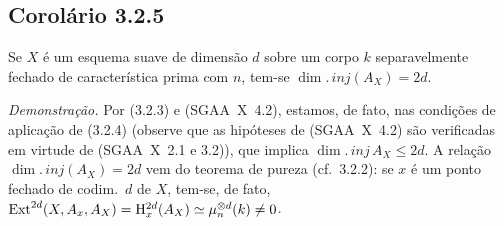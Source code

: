 \subsection*{Corolário 3.2.5}
Se $X$ é um esquema suave de dimensão $d$ sobre um corpo $k$ separavelmente fechado de característica prima com $n$, tem-se $\dim.\,inj(A_X) = 2d$.

\emph{Demonstração.} Por (3.2.3) e (SGAA~X~4.2), estamos, de fato, nas condições de aplicação de (3.2.4) (observe que as hipóteses de (SGAA~X~4.2) são verificadas em virtude de (SGAA~X~2.1 e 3.2)), que implica $\dim.\,inj\, A_X \leqslant 2d$. A relação $\dim.\,inj(A_X) = 2d$ vem do teorema de pureza (cf.~3.2.2): se $x$ é um ponto fechado de codim.~$d$ de $X$, tem-se, de fato, $\operatorname{Ext}^{2d}(X, A_x, A_X) = \mathrm{H}^{2d}_x(A_X) \simeq \mu_n^{\otimes d}(k) \neq 0$.
